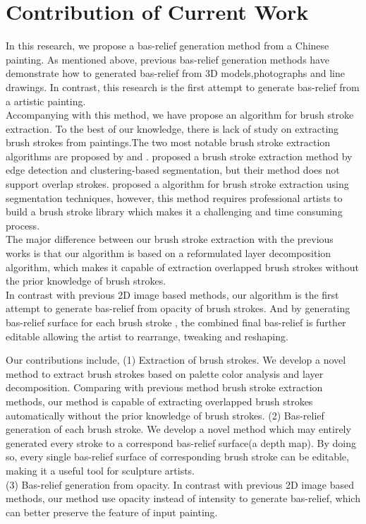 \section{Contribution of Current Work}
In this research, we propose a bas-relief generation method from a Chinese painting. As mentioned above, previous bas-relief generation methods have demonstrate how to generated bas-relief from 3D models,photographs and line drawings. In contrast, this research is the first attempt to generate bas-relief from a artistic painting. \\ Accompanying with this method, we have propose an algorithm for brush stroke extraction. To the best of our knowledge, there is lack of study on extracting brush strokes from paintings.The two most notable brush stroke extraction algorithms are proposed by \cite{li2012rhythmic} and \cite{xu2006animating}. \cite{li2012rhythmic} proposed a brush stroke extraction method by edge detection and clustering-based segmentation, but their method does not support overlap strokes.\cite{xu2006animating} proposed a algorithm for brush stroke extraction using segmentation techniques, however, this method requires professional artists to build a brush stroke library which makes it a challenging and time consuming process. \\ 
The major difference between our brush stroke extraction with the previous works is that our algorithm is based on a reformulated layer decomposition algorithm, which makes it capable of extraction overlapped brush strokes without the prior knowledge of brush strokes.\\
In contrast with previous 2D image based methods, our algorithm is the first attempt to generate bas-relief from opacity of brush strokes. And by generating bas-relief surface for each brush stroke , the combined final bas-relief is further editable allowing the artist to rearrange, tweaking and reshaping.


Our contributions include,
\newline
(1) Extraction of brush strokes. We develop a novel method to extract brush strokes based on palette color analysis and layer decomposition.  Comparing with previous method brush stroke extraction methods, our method is capable of extracting overlapped brush strokes automatically without the prior knowledge of brush strokes. 
\newline
(2) Bas-relief generation of each brush stroke. We develop a novel method which may entirely generated every stroke to a correspond bas-relief surface(a depth map). By doing so, every single bas-relief surface of corresponding brush stroke can be editable, making it a useful tool for sculpture artists.\\
(3) Bas-relief generation from opacity. In contrast with previous 2D image based methods, our method use opacity instead of intensity to generate bas-relief, which can better preserve the feature of input painting. 

